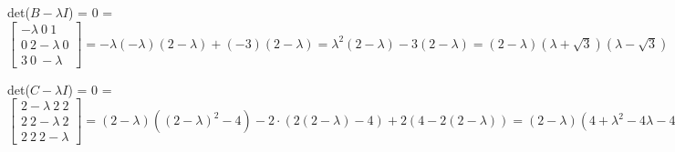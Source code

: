 \documentclass[11pt]{article}
\begin{document}
det(\(B-\lambda I \)) = 0 = \(\begin{bmatrix} -\lambda \ 0 \ 1 \\ 0 \ 2-\lambda \ 0 \\ 3 \ 0 \ -\lambda \end{bmatrix} = -\lambda (-\lambda)(2-\lambda)+(-3)(2-\lambda) = \lambda^2(2-\lambda) -3(2-\lambda) = (2-\lambda)(\lambda+\sqrt{3})(\lambda - \sqrt{3})\,\to\,\lambda = 2, \sqrt{3}, -\sqrt{3}\)

det(\(C - \lambda I\)) = 0 = \(\begin{bmatrix} 2-\lambda \ 2 \ 2 \\ 2 \ 2-\lambda \ 2 \\ 2 \ 2 \ 2-\lambda\end{bmatrix} = (2 - \lambda)((2-\lambda)^2 - 4) - 2\cdot(2(2-\lambda)-4) + 2(4-2(2-\lambda)) = (2-\lambda)(4+\lambda^2-4\lambda-4)-2(4-2\lambda-4)+8-4(2-\lambda)=8+2\lambda^2 - 8\lambda-8-4\lambda-\lambda^3+4\lambda^2 + 4\lambda + 4\lambda + 8 - 8 + 4\lambda = - \lambda^3 + 6\lambda^2 = \lambda^2(6-\lambda)\) 
\end{document}
